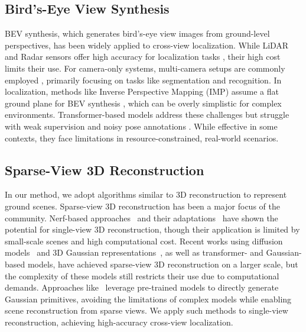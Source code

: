 

\subsection{Bird’s-Eye View Synthesis}
BEV synthesis, which generates bird’s-eye view images from ground-level perspectives, has been widely applied to cross-view localization. While LiDAR and Radar sensors offer high accuracy for localization tasks \cite{qin2023supfusion, harley2023simple, lin2024rcbevdet, liu2025seed}, their high cost limits their use. For camera-only systems, multi-camera setups are commonly employed \cite{reiher2020sim2real, li2022bevformer, yang2023parametric}, primarily focusing on tasks like segmentation and recognition. In localization, methods like Inverse Perspective Mapping (IMP) assume a flat ground plane for BEV synthesis \cite{shi2024weakly, wang2024fine}, which can be overly simplistic for complex environments. Transformer-based models address these challenges but struggle with weak supervision and noisy pose annotations \cite{fervers2022uncertainty, shi2023boosting, sarlin2023orienternet}. While effective in some contexts, they face limitations in resource-constrained, real-world scenarios.

\subsection{Sparse-View 3D Reconstruction}
In our method, we adopt algorithms similar to 3D reconstruction to represent ground scenes. Sparse-view 3D reconstruction has been a major focus of the community. Nerf-based approaches~\cite{mildenhall2021nerf} and their adaptations~\cite{hong2023lrm} have shown the potential for single-view 3D reconstruction, though their application is limited by small-scale scenes and high computational cost. Recent works using diffusion models~\cite{rombach2021highresolution} and 3D Gaussian representations~\cite{kerbl20233d}\cite{cai2024baking, zhou2024diffgs, mu2025gsd}, as well as transformer- and Gaussian-based models\cite{chen2024splatformer, GaussTR}, have achieved sparse-view 3D reconstruction on a larger scale, but the complexity of these models still restricts their use due to computational demands. Approaches like~\cite{zhou2024feature, wewer2025latentsplat} leverage pre-trained models to directly generate Gaussian primitives, avoiding the limitations of complex models while enabling scene reconstruction from sparse views. We apply such methods to single-view reconstruction, achieving high-accuracy cross-view localization.